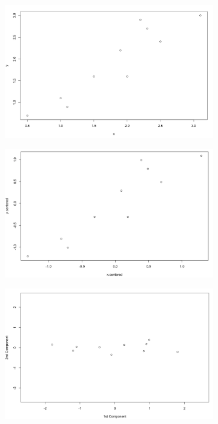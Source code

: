 \documentclass[11pt, oneside]{article}   	%
\begin{document}
\begin{figure}[!h]
	\centering
	\begin{subfigure}{.45\textwidth}
		\includegraphics[width=\textwidth]{example1-plot-two-genes}
		\caption{}
		\label{fig:PlotTwoGenes}
	\end{subfigure}
	\begin{subfigure}{0.45\textwidth}
		\includegraphics[width=\textwidth]{example1-plot-two-genes-centered}
		\caption{}
		\label{fig:PlotTwoGenesCentered}
	\end{subfigure}
	\begin{subfigure}{0.45\textwidth}
		\includegraphics[width=\textwidth]{example1_plot_2PC}

\end{subfigure}
\end{figure}
\end{document}
